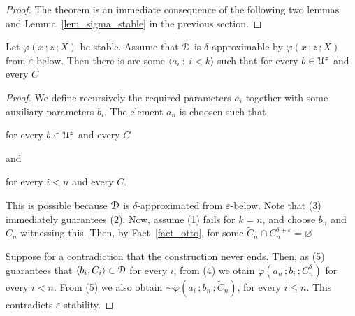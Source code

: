 \begin{proof}
  The theorem is an immediate consequence of the following two lemmas and Lemma~\ref{lem_sigma_stable} in the previous section.
\end{proof}



\begin{lemma}
  Let $\varphi(x\,;z\,;X)$ be stable.
  Assume that ${\EuScript D}$ is $\delta$-approximable by $\varphi(x\,;z\,;X)$ from $\varepsilon$-below.
  Then there is are some $\langle a_i\ :\ i<k\rangle$ such that for every $b\in{\EuScript U}^z$ and every $C$\medskip

  \medskip 

\end{lemma}

\begin{proof}
  We define recursively the required parameters $a_i$ together with some auxiliary parameters $b_i$.
  The element $a_n$ is choosen such that

\hfill for every $b\in{\EuScript U}^z$ and every $C$

and

\hfill for every $i<n$ and every $C$.\smallskip

This is possible because ${\EuScript D}$ is $\delta$-approximated from $\varepsilon$-below.
Note that (3) immediately guarantees (2).
Now, assume (1) fails for $k=n$, and choose $b_n$ and $C_n$ witnessing this.
Then, by Fact~\ref{fact_otto}, for some $\tilde C_n\cap C_n^{\delta+\varepsilon}=\varnothing$


Suppose for a contradiction that the construction never ends.
Then, as (5) guarantees that $\langle b_i,C_i\rangle\in{\EuScript D}$ for every $i$, from (4) we otain $\varphi(a_n\,;b_i\,;C_n^\delta)$ for every $i<n$.
From (5) we also obtain ${\sim}\varphi(a_i\,;b_n\,;\tilde C_n)$, for every $i\le n$.
This contradicts $\varepsilon$-stability.
\end{proof}

